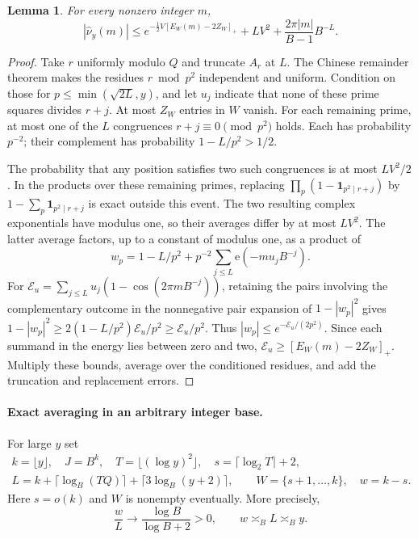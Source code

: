 \documentclass[11pt]{article}
\newtheorem{lemma}{Lemma}
\newcommand{\ee}{\mathrm e}
\newcommand{\ind}{\mathbf 1}
\begin{document}
\begin{lemma}\label{crt}
For every nonzero integer $m$,
\[
 |\widehat\nu_y(m)|
 \le e^{-\frac12V[E_W(m)-2Z_W]_+}
                 +LV^2+\frac{2\pi|m|}{B-1}B^{-L}.
\]
\end{lemma}
\begin{proof}
Take $r$ uniformly modulo $Q$ and truncate $A_r$ at $L$.
The Chinese remainder theorem makes the residues $r\bmod p^2$
independent and uniform. Condition on those for
$p\le\min(\sqrt{2L},y)$, and let $u_j$ indicate that none of these
prime squares divides $r+j$. At most $Z_W$ entries in $W$ vanish.
For each remaining prime, at most one of the $L$ congruences
$r+j\equiv0\pmod{p^2}$ holds. Each has probability $p^{-2}$;
their complement has probability $1-L/p^2>1/2$.

The probability that any position satisfies two such congruences is
at most $LV^2/2$. In the products over these remaining primes, replacing
$\prod_p(1-\ind_{p^2\mid r+j})$ by
$1-\sum_p\ind_{p^2\mid r+j}$ is exact outside this event.
The two resulting complex exponentials have modulus one, so their
averages differ by at most $LV^2$.
The latter average factors, up to a constant of modulus one, as
a product of
\[
 w_p=1-L/p^2+p^{-2}\sum_{j\le L}\ee(-mu_jB^{-j}).
\]
For $\mathcal E_u=\sum_{j\le L}u_j(1-\cos(2\pi mB^{-j}))$,
retaining the pairs involving the complementary outcome in the
nonnegative pair expansion of $1-|w_p|^2$ gives
$1-|w_p|^2\ge2(1-L/p^2)\mathcal E_u/p^2\ge\mathcal E_u/p^2$.
Thus $|w_p|\le e^{-\mathcal E_u/(2p^2)}$.
Since each summand in the energy lies between zero and two,
$\mathcal E_u\ge[E_W(m)-2Z_W]_+$.
Multiply these bounds, average over the conditioned residues, and add
the truncation and replacement errors.
\end{proof}

\paragraph{Exact averaging in an arbitrary integer base.}
For large $y$ set
\[
 \begin{gathered}
 k=\lfloor y\rfloor,\quad J=B^k,\quad T=\lfloor(\log y)^2\rfloor,
 \quad s=\lceil\log_2T\rceil+2,\\
 L=k+\lceil\log_B(TQ)\rceil+\lceil3\log_B(y+2)\rceil,\qquad
 W=\{s+1,\ldots,k\},\quad w=k-s .
 \end{gathered}
\]
Here $s=o(k)$ and $W$ is nonempty eventually. More precisely,
\[
 \frac{w}{L}\longrightarrow\frac{\log B}{\log B+2}>0,
 \qquad w\asymp_B L\asymp_B y.
\]
\end{document}
